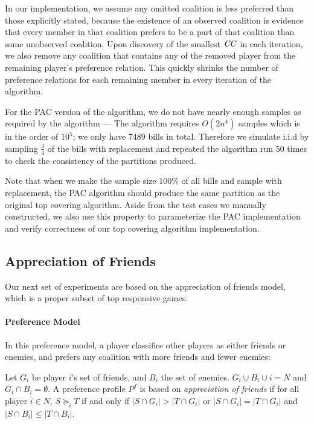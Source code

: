 In our implementation, we assume any omitted coalition is less preferred
than those explicitly stated, because the existence of an observed
coalition is evidence that every member in that coalition prefers to be
a part of that coalition than some unobserved coalition.
Upon discovery of the smallest $\mathit{CC}$ in each iteration, we also remove any coalition that contains any of the removed player from the remaining player's preference relation. This quickly shrinks the number of preference relations for each remaining member in every iteration of the algorithm.

For the PAC version of the algorithm, we do not have nearly enough samples
as required by the algorithm --- The algorithm requires $O(2n^4)$ samples
which is in the order of $10^5$; we only have 7489 bills in total.
Therefore we simulate i.i.d by sampling $\frac{3}{4}$ of the bills
with replacement and repeated the algorithm run 50 times to check
the consistency of the partitions produced.

Note that when we make the sample size $100\%$ of all bills and sample
with replacement, the PAC algorithm should produce the same partition
as the original top covering algorithm.
Aside from the test cases we manually constructed, we also use this property to parameterize the PAC implementation and verify correctness of
our top covering algorithm implementation.


\subsection{Appreciation of Friends}
\label{subsec:appreciation_of_friends}

Our next set of experiments are based on the appreciation of friends model,
which is a proper subset of top responsive games.

\paragraph{Preference Model}

In this preference model, a player classifies other players as either friends
or enemies, and prefers any coalition with more friends and fewer enemies:

Let $G_i$ be player $i$'s set of friends, and $B_i$ the set of enemies. $G_i \cup B_i \cup i = N$ and $G_i \cap B_i = \emptyset$. A preference profile $P^f$ is based on \textit{appreciation of friends} if for all player $i \in N$, $S \succeq_i T$ if and only if $|S \cap G_i| > |T \cap G_i|$ or $|S \cap G_i| = |T \cap G_i|$ and $|S \cap B_i| \leq |T \cap B_i|$.

